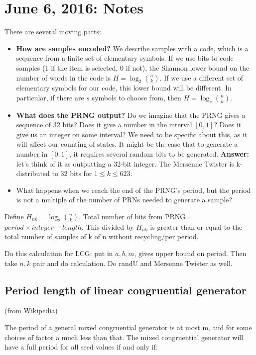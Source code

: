 \documentclass[12pt]{article}
\begin{document}
\section{June 6, 2016: Notes}
There are several moving parts:
\begin{itemize}
\item \textbf{How are samples encoded?} 
We describe samples with a code, which is a sequence from a finite set of elementary symbols.
If we use bits to code samples (1 if the item is selected, 0 if not), the Shannon lower bound on the number
of words in the code is $H = \log_2 {n \choose k}$.
If we use a different set of elementary symbols for our code, this lower bound will be different.
In particular, if there are $s$ symbols to choose from, then $H = \log_s {n \choose k}$.
\item \textbf{What does the PRNG output?}
Do we imagine that the PRNG gives a sequence of 32 bits?
Does it give a number in the interval $[0, 1]$?
Does it give us an integer on some interval?
We need to be specific about this, as it will affect our counting of states.
It might be the case that to generate a number in $[0, 1]$, it requires several random bits to be generated.
\textbf{Answer:} let's think of it as outputting a 32-bit integer.
The Mersenne Twister is k-distributed to 32 bits for $1 \leq k \leq 623$.
\item What happens when we reach the end of the PRNG's period, 
but the period is not a multiple of the number of PRNs needed to generate a sample?
\end{itemize}

Define $H_{nk} = \log_2 {n \choose k}$.
Total number of bits from PRNG = $period \times integer-length$. 
This divided by $H_{nk}$ is greater than or equal to the total number of samples of k of n without recycling/per period.


Do this calculation for LCG: put in $a, b, m$, gives upper bound on period.
Then take $n, k$ pair and do calculation.
Do randU and Mersenne Twister as well.


\subsection{Period length of linear congruential generator}
(from Wikipedia)

The period of a general mixed congruential generator is at most m, and for some choices of factor a much less than that. The mixed congruential generator will have a full period for all seed values if and only if:
\end{document}
